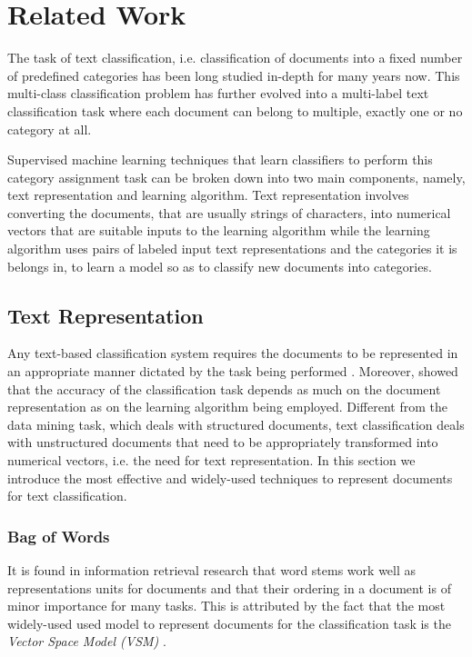 \chapter{Related Work}
\label{chapter:relatedwork}
The task of text classification, i.e. classification of documents into a fixed number of predefined categories has been long studied in-depth for many years now. This multi-class classification problem has further evolved into a multi-label text classification task where each document can belong to multiple, exactly one or no category at all. 

Supervised machine learning techniques that learn classifiers to perform this category assignment task can be broken down into two main components, namely, text representation and learning algorithm. 
Text representation involves converting the documents, that are usually strings of characters, into numerical vectors that are suitable inputs to the learning algorithm while the learning algorithm uses pairs of labeled input text representations and the categories it is belongs in, to learn a model so as to classify new documents into categories.

\section{Text Representation}
\label{sec:textrepr}
Any text-based classification system requires the documents to be represented in an appropriate manner dictated by the task being performed \citep{lewis1992text}. Moreover, \citep{quinlan1983learning} showed that the accuracy of the classification task depends as much on the document representation as on the learning algorithm being employed. Different from the data mining task, which deals with structured documents, text classification deals with unstructured documents that need to be appropriately transformed into numerical vectors, i.e. the need for text representation. In this section we introduce the most effective and widely-used techniques to represent documents for text classification.

\subsection{Bag of Words}
It is found in information retrieval research that word stems work well as representations units for documents and that their ordering in a document is of minor importance for many tasks. This is attributed by the fact that the most widely-used used model to represent documents for the classification task is the \emph{Vector Space Model (VSM)} \citep{salton1973specification}. 

